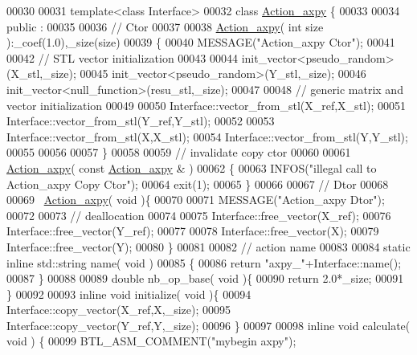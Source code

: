 \begin{DoxyCode}
00030 
00031 \textcolor{keyword}{template}<\textcolor{keyword}{class} Interface>
00032 \textcolor{keyword}{class }\hyperlink{class_action__axpy}{Action\_axpy} \{
00033 
00034 public :
00035 
00036   \textcolor{comment}{// Ctor}
00037 
00038   \hyperlink{class_action__axpy}{Action\_axpy}( \textcolor{keywordtype}{int} size ):\_coef(1.0),\_size(size)
00039   \{
00040     MESSAGE(\textcolor{stringliteral}{"Action\_axpy Ctor"});
00041 
00042     \textcolor{comment}{// STL vector initialization}
00043 
00044     init\_vector<pseudo\_random>(X\_stl,\_size);
00045     init\_vector<pseudo\_random>(Y\_stl,\_size);
00046     init\_vector<null\_function>(resu\_stl,\_size);
00047 
00048     \textcolor{comment}{// generic matrix and vector initialization}
00049 
00050     Interface::vector\_from\_stl(X\_ref,X\_stl);
00051     Interface::vector\_from\_stl(Y\_ref,Y\_stl);
00052 
00053     Interface::vector\_from\_stl(X,X\_stl);
00054     Interface::vector\_from\_stl(Y,Y\_stl);
00055 
00056 
00057   \}
00058 
00059   \textcolor{comment}{// invalidate copy ctor}
00060 
00061   \hyperlink{class_action__axpy}{Action\_axpy}( \textcolor{keyword}{const}  \hyperlink{class_action__axpy}{Action\_axpy} & )
00062   \{
00063     INFOS(\textcolor{stringliteral}{"illegal call to Action\_axpy Copy Ctor"});
00064     exit(1);
00065   \}
00066 
00067   \textcolor{comment}{// Dtor}
00068 
00069   ~\hyperlink{class_action__axpy}{Action\_axpy}( \textcolor{keywordtype}{void} )\{
00070 
00071     MESSAGE(\textcolor{stringliteral}{"Action\_axpy Dtor"});
00072 
00073     \textcolor{comment}{// deallocation}
00074 
00075     Interface::free\_vector(X\_ref);
00076     Interface::free\_vector(Y\_ref);
00077 
00078     Interface::free\_vector(X);
00079     Interface::free\_vector(Y);
00080   \}
00081 
00082   \textcolor{comment}{// action name}
00083 
00084   \textcolor{keyword}{static} \textcolor{keyword}{inline} std::string name( \textcolor{keywordtype}{void} )
00085   \{
00086     \textcolor{keywordflow}{return} \textcolor{stringliteral}{"axpy\_"}+Interface::name();
00087   \}
00088 
00089   \textcolor{keywordtype}{double} nb\_op\_base( \textcolor{keywordtype}{void} )\{
00090     \textcolor{keywordflow}{return} 2.0*\_size;
00091   \}
00092 
00093   \textcolor{keyword}{inline} \textcolor{keywordtype}{void} initialize( \textcolor{keywordtype}{void} )\{
00094     Interface::copy\_vector(X\_ref,X,\_size);
00095     Interface::copy\_vector(Y\_ref,Y,\_size);
00096   \}
00097 
00098   \textcolor{keyword}{inline} \textcolor{keywordtype}{void} calculate( \textcolor{keywordtype}{void} ) \{
00099     BTL\_ASM\_COMMENT(\textcolor{stringliteral}{"mybegin axpy"});

\end{DoxyCode}
